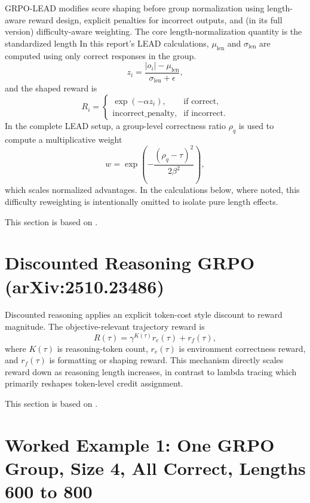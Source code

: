 \documentclass[11pt]{article}
\begin{document}
GRPO-LEAD modifies score shaping before group normalization using length-aware reward design, explicit penalties for incorrect outputs, and (in its full version) difficulty-aware weighting. The core length-normalization quantity is the standardized length
In this report's LEAD calculations, $\mu_{\mathrm{len}}$ and $\sigma_{\mathrm{len}}$ are computed using only correct responses in the group.
\begin{equation}
z_i = \frac{|o_i|-\mu_{\mathrm{len}}}{\sigma_{\mathrm{len}}+\epsilon},
\end{equation}
and the shaped reward is
\begin{equation}
R_i =
\begin{cases}
\exp(-\alpha z_i), & \text{if correct},\\
\text{incorrect\_penalty}, & \text{if incorrect}.
\end{cases}
\end{equation}
In the complete LEAD setup, a group-level correctness ratio $\rho_q$ is used to compute a multiplicative weight
\begin{equation}
w = \exp\!\left(-\frac{(\rho_q-\tau)^2}{2\beta^2}\right),
\end{equation}
which scales normalized advantages. In the calculations below, where noted, this difficulty reweighting is intentionally omitted to isolate pure length effects.

This section is based on \cite{grpo-LEAD}.

\section{Discounted Reasoning GRPO (arXiv:2510.23486)}

Discounted reasoning applies an explicit token-cost style discount to reward magnitude. The objective-relevant trajectory reward is
\begin{equation}
R(\tau) = \gamma^{K(\tau)} r_e(\tau) + r_f(\tau),
\end{equation}
where $K(\tau)$ is reasoning-token count, $r_e(\tau)$ is environment correctness reward, and $r_f(\tau)$ is formatting or shaping reward. This mechanism directly scales reward down as reasoning length increases, in contrast to lambda tracing which primarily reshapes token-level credit assignment.

This section is based on \cite{naive-discount}.

\section{Worked Example 1: One GRPO Group, Size 4, All Correct, Lengths 600 to 800}
\end{document}
